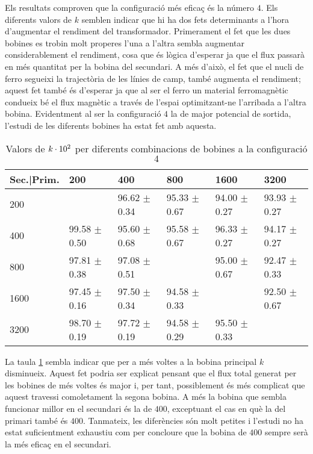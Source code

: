 Els resultats comproven que la configuració més eficaç és la número $4$. Els diferents valors de $k$ semblen indicar que hi ha dos fets determinants a l'hora d'augmentar el rendiment del transformador. Primerament el fet que les dues bobines es trobin molt properes l'una a l'altra sembla augmentar considerablement el rendiment, cosa que és lògica d'esperar ja que el flux passarà en més quantitat per la bobina del secundari. A més d'això, el fet que el nucli de ferro segueixi la trajectòria de les línies de camp, també augmenta el rendiment; aquest fet també és d'esperar ja que al ser el ferro un material ferromagnètic condueix bé el flux magnètic a través de l'espai optimitzant-ne l'arribada a l'altra bobina. Evidentment al ser la configuració $4$ la de major potencial de sortida, l'estudi de les diferents bobines ha estat fet amb aquesta.

 \begin{table}[!htbp]
     \centering
     \setlength\tabcolsep{2pt}
     \caption{Valors de $k \cdot \num{d2}$ per diferents combinacions de bobines a la configuració $4$}
     \label{tab:k4}
\begin{tabular}{p{2cm}p{}p{}p{}p{}p{}}
			\toprule
		   {Sec.|Prim.}    &200&400&800&1600&3200 \\
			\midrule
			200 &  & 96.62 $\pm$ 0.34  & 95.33 $\pm$ 0.67 & 94.00 $\pm$ 0.27 &  93.93 $\pm$ 0.27 \\
			400 &  99.58 $\pm$ 0.50 & 95.60 $\pm$ 0.68 & 95.58 $\pm$ 0.67 & 96.33 $\pm$ 0.27 & 94.17 $\pm$ 0.27 \\
			800 &  97.81 $\pm$ 0.38 & 97.08 $\pm$ 0.51 & & 95.00 $\pm$ 0.67 & 92.47 $\pm$ 0.33\\
			1600 &  97.45 $\pm$ 0.16 & 97.50 $\pm$ 0.34 & 94.58 $\pm$ 0.33 & & 92.50 $\pm$ 0.67\\
			3200 & 98.70 $\pm$ 0.19 & 97.72 $\pm$ 0.19 & 94.58 $\pm$ 0.29 & 95.50 $\pm$ 0.33 & \\
			\bottomrule
\end{tabular}
\end{table}

La taula \cref{tab:k4} sembla indicar que per a més voltes a la bobina principal $ k$ disminueix. Aquest fet podria ser explicat pensant que el flux total generat per les bobines de més voltes és major i, per tant,  possiblement és més complicat que aquest travessi comoletament la segona bobina. A més la bobina que sembla funcionar millor en el secundari és la de $400$, exceptuant el cas en què la del primari també és $400$. Tanmateix, les diferències són molt petites i l'estudi no ha estat suficientment exhaustiu com per concloure que la bobina de $400$ sempre serà la més eficaç en el secundari.


